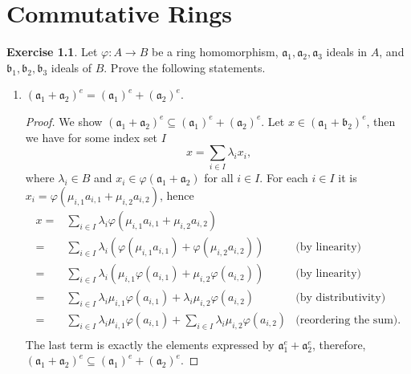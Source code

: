 \documentclass{book}
\theoremstyle{plain}
\theoremstyle{definition}
\newtheorem{exr}[thm]{Exercise}
\theoremstyle{custom_definition}
\begin{document}
%
%
%
\chapter{Commutative Rings}
\begin{exr}
  Let \(\varphi: A \longrightarrow B\) be a ring homomorphism, \(\mathfrak{a}_1, \mathfrak{a}_2, \mathfrak{a}_3\) ideals in \(A\), and \(\mathfrak{b}_1, \mathfrak{b}_2, \mathfrak{b}_3\) ideals of \(B\). Prove the following statements.
  \begin{enumerate}
    \item \((\mathfrak{a}_1 + \mathfrak{a}_2)^e = (\mathfrak{a}_1)^e + (\mathfrak{a}_2)^e\).
    \begin{proof}
      We show \((\mathfrak{a}_1 + \mathfrak{a}_2)^e \subseteq (\mathfrak{a}_1)^e + (\mathfrak{a}_2)^e\). Let \(x \in (\mathfrak{a}_1 + \mathfrak{b}_2)^e\), then we have for some index set \(I\)
      \begin{equation}
        x = \sum_{i \in I} \lambda_i x_i \text{,}
      \end{equation}
      where \(\lambda_i \in B\) and \(x_i \in \varphi(\mathfrak{a}_1 + \mathfrak{a}_2)\) for all \(i \in I\). For each \(i \in I\) it is \(x_i = \varphi(\mu_{i, 1} a_{i, 1} + \mu_{i, 2} a_{i, 2})\), hence
      \begin{align}
        x =& \sum_{i \in I} \lambda_i \varphi(\mu_{i, 1} a_{i, 1} + \mu_{i, 2} a_{i, 2}) &  \\
        =& \sum_{i \in I} \lambda_i \left( \varphi(\mu_{i, 1} a_{i, 1}) + \varphi(\mu_{i, 2} a_{i, 2}) \right)&\text{(by linearity)} \\
        =& \sum_{i \in I} \lambda_i \left( \mu_{i, 1} \varphi( a_{i, 1}) + \mu_{i, 2} \varphi( a_{i, 2}) \right)&\text{(by linearity)} \\
        =& \sum_{i \in I} \lambda_i \mu_{i, 1}\varphi( a_{i, 1}) + \lambda_i \mu_{i, 2}\varphi( a_{i, 2}) & \text{(by distributivity)} \\
        =& \sum_{i \in I} \lambda_i \mu_{i, 1} \varphi( a_{i, 1}) + \sum_{i \in I} \lambda_i \mu_{i, 2} \varphi( a_{i, 2}) & \text{(reordering the sum)} \text{.} \\
      \end{align}
      The last term is exactly the elements expressed by \(\mathfrak{a}_1^e + \mathfrak{a}_2^e\), therefore, \((\mathfrak{a}_1 + \mathfrak{a}_2)^e \subseteq (\mathfrak{a}_1)^e + (\mathfrak{a}_2)^e\).


\end{proof}
\end{enumerate}
\end{exr}
\end{document}

